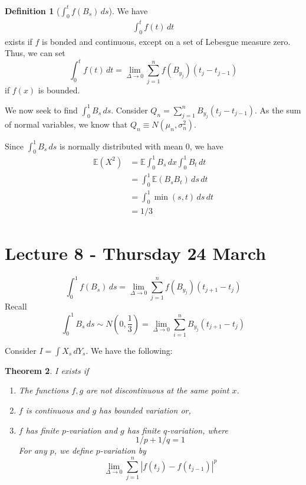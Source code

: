 \documentclass[10pt, oneside, reqno]{amsart}
\theoremstyle{plain}%
\newtheorem{thm}{Theorem}[section]
\theoremstyle{definition}
\newtheorem{defn}[thm]{Definition}
\theoremstyle{remark}
\newcommand{\E}{\mathbb{E}}
\begin{document}
\begin{defn}[$\int_0^t f(B_s) \, ds$]
	
	We have \begin{align*}
	\int_0^t f(t) \, dt
	\end{align*} exists if $f$ is bonded and continuous, except on a set of Lebesgue measure zero.
	Thus, we can set \[
		\int_0^t f(t) \, dt = \lim_{ \Delta \rightarrow 0} \sum_{j=1}^n f(B_{y_j}) (t_j - t_{j-1})
	\] if $f(x)$ is bounded.  
	
	We now seek to find $\int_0^1 B_s \, ds$.  Consider $Q_n = \sum_{j=1}^n B_{y_j} (t_j - t_{j-1})$.  As the sum of normal variables, we know that $Q_n \equiv N(\mu_n, \sigma^2_n)$.      
	
	Since $\int_0^1 B_s \, ds$ is normally distributed with mean 0, we have 
	\begin{align*}
		\E(X^2) &= \E \int_0^1 B_s \, dx \int_0^1 B_t \, dt  \\
				&= \int_0^1 \E(B_s B_t) \, ds \, dt \\
				&= \int_0^1 \min(s,t) \, ds \, dt \\
				&= 1/3
	\end{align*}
\end{defn}


\section{Lecture 8 - Thursday 24 March} %
\label{sec:lecture_8_thursday_24_march}

\[
	\int_0^1 f(B_s) \, ds = \lim_{\Delta \rightarrow 0} \sum_{j=1}^n f(B_{y_j}) (t_{j+1} - t_{j})
\]
Recall \[
	\int_0^1 B_s \, ds \sim N(0, \frac{1}{3}) = \lim_{\Delta \rightarrow 0} \sum_{i=1}^n {B_{y_j}} (t_{j+1} - t_{j})
\]

Consider $I = \int X_s \, dY_s$.  We have the following:
\begin{thm}
	I exists if 
	\begin{enumerate}[(1)]
		\item The functions $f,g$ are not discontinuous at the same point $x$.  
		\item $f$ is continuous and $g$ has bounded variation or,
		\item[(2)'] $f$ has finite $p$-variation and $g$ has finite $q$-variation, where \[
			1/p + 1/q = 1
		\]  For any $p$, we define $p$-variation by \[
			\lim_{\Delta \rightarrow 0} \sum_{j=1}^n |f(t_j) - f(t_{j-1}) |^p
		\]
	\end{enumerate}
\end{thm}
\end{document}
